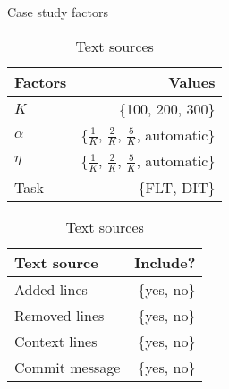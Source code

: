 \begin{table}
\begin{spacing}{1.2}
\centering
\parbox{.45\linewidth}{
\centering
\caption{Case study factors}
\label{table:combo-rq1}
\begin{tabular}{lr}
\toprule
Factors           &  Values  \\
\midrule
$K$             &  \{100, 200, 300\} \\
$\alpha$      &  \{$\frac{1}{K}$, $\frac{2}{K}$, $\frac{5}{K}$, automatic\} \\
$\eta$      &  \{$\frac{1}{K}$, $\frac{2}{K}$, $\frac{5}{K}$, automatic\} \\
Task      &  \{FLT, DIT\} \\
\bottomrule
\end{tabular}
}
\hfill
\parbox{.45\linewidth}{
\centering
\caption{Text sources}
\vspace{0.2em}
\label{table:combo-rq2}
\begin{tabular}{lr}
\toprule
Text source   &  Include? \\
\midrule
Added lines   &  \{yes, no\} \\
Removed lines   &  \{yes, no\} \\
Context lines   &  \{yes, no\} \\
Commit message   &  \{yes, no\} \\
\bottomrule
\end{tabular}
}
\end{spacing}
\end{table}
